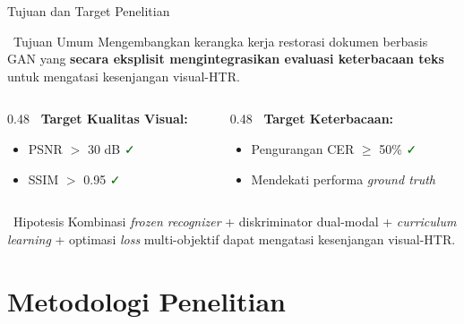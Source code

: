 \documentclass[aspectratio=169,10pt,t]{beamer}
\begin{document}
\begin{frame}{Tujuan dan Target Penelitian}
    \begin{block}{\faBullseye~Tujuan Umum}
        Mengembangkan kerangka kerja restorasi dokumen berbasis GAN yang \textbf{secara eksplisit mengintegrasikan evaluasi keterbacaan teks} untuk mengatasi kesenjangan visual-HTR.
    \end{block}
    
    \vspace{0.5em}
    \begin{columns}[T]
        \begin{column}{0.48\textwidth}
            \textbf{\faChartLine~Target Kualitas Visual:}
            \begin{itemize}
                \item PSNR $>$ 30 dB \textcolor{darkgreen}{\faCheck}
                \item SSIM $>$ 0.95 \textcolor{darkgreen}{\faCheck}
            \end{itemize}
        \end{column}
        \begin{column}{0.48\textwidth}
            \textbf{\faFont~Target Keterbacaan:}
            \begin{itemize}
                \item Pengurangan CER $\geq$ 50\% \textcolor{darkgreen}{\faCheck}
                \item Mendekati performa \textit{ground truth}
            \end{itemize}
        \end{column}
    \end{columns}
    
    \vspace{0.5em}
    \begin{alertblock}{\faLightbulb~Hipotesis}
        Kombinasi \textit{frozen recognizer} + diskriminator dual-modal + \textit{curriculum learning} + optimasi \textit{loss} multi-objektif dapat mengatasi kesenjangan visual-HTR.
    \end{alertblock}
\end{frame}

\section{Metodologi Penelitian}
\end{document}
